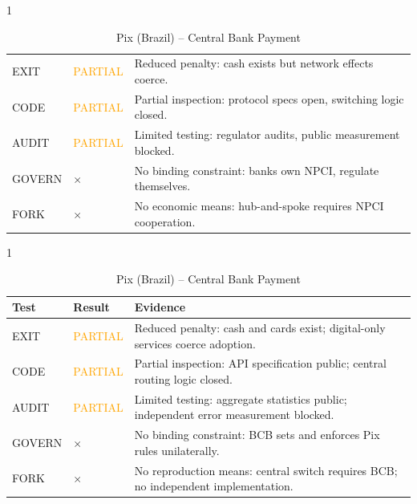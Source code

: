 \begin{table}[htbp]
    \begin{subtable}{1\textwidth}
        \centering
        \caption{UPI (India) -- Payment Rail}
        \small
        \begin{tabular}{@{}llp{8.5cm}@{}}
            \toprule
            EXIT & \textcolor{orange}{PARTIAL} & Reduced penalty: cash exists but network effects coerce. \\
            CODE & \textcolor{orange}{PARTIAL} & Partial inspection: protocol specs open, switching logic closed. \\
            AUDIT & \textcolor{orange}{PARTIAL} & Limited testing: regulator audits, public measurement blocked. \\
            GOVERN & $\times$ & No binding constraint: banks own NPCI, regulate themselves. \\
            FORK & $\times$ & No economic means: hub-and-spoke requires NPCI cooperation. \\
            \bottomrule
        \end{tabular}
        \vspace{0.3cm}
    \end{subtable}

    \begin{subtable}{1\textwidth}
        \centering
        \caption{Pix (Brazil) -- Central Bank Payment}
        \small
        \begin{tabular}{@{}llp{8.5cm}@{}}
            \toprule
            \textbf{Test} & \textbf{Result} & \textbf{Evidence} \\
            \midrule
            EXIT & \textcolor{orange}{PARTIAL} & Reduced penalty: cash and cards exist; digital-only services coerce adoption. \\
            CODE & \textcolor{orange}{PARTIAL} & Partial inspection: API specification public; central routing logic closed. \\
            AUDIT & \textcolor{orange}{PARTIAL} & Limited testing: aggregate statistics public; independent error measurement blocked. \\
            GOVERN & $\times$ & No binding constraint: BCB sets and enforces Pix rules unilaterally. \\
            FORK & $\times$ & No reproduction means: central switch requires BCB; no independent implementation. \\
            \bottomrule
        \end{tabular}
        \vspace{0.3cm}
    \end{subtable}


\end{table}
